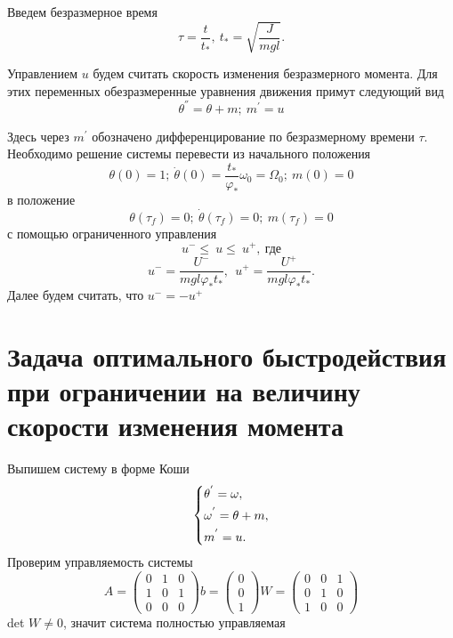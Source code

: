 \documentclass[a4paper,14pt]{article}
\theoremstyle{plain} %
\theoremstyle{definition} %
\theoremstyle{remark} %
\begin{document}
{Введем безразмерное время
\[
    \tau=\frac{t}{t_\ast},\ t_\ast=\sqrt{\frac{J}{mgl}}.
\]

Управлением $u$ будем считать скорость изменения безразмерного
момента. Для этих переменных обезразмеренные уравнения движения
примут следующий вид
\[
    \theta^{''}=\theta+m;\ m^{'}=u
\]

Здесь через $m^{'}$ обозначено дифференцирование по
безразмерному времени $\tau$. Необходимо решение системы
перевести из начального положения
\begin{equation}\label{9}
    \theta(0)=1;\ \dot{\theta}(0)=\frac{t_\ast}{\varphi_\ast}\omega_0=\Omega_0;\ m(0)=0
\end{equation}
в положение
\begin{equation}\label{9}
    \theta(\tau_f)=0;\ \dot{\theta}(\tau_f)=0;\ m(\tau_f)=0
\end{equation}
с помощью ограниченного управления
\[
    u^-\le\ u\le\ u^+,\ \text{где}
\]
\[
    u^-=\frac{U^-}{mgl\varphi_\ast t_\ast},\ \ u^+=\frac{U^+}{mgl\varphi_\ast t_\ast}.
\]
Далее будем считать, что $u^-=-u^+$
\newpage
\section{Задача оптимального быстродействия при ограничении на величину скорости изменения момента}
Выпишем систему в форме Коши
\begin{equation}\label{koshisystem}
    \left\{ {\begin{aligned}
                 & \theta^{'} = \omega , \hfill   \\
                 & \omega^{'} = \theta+m , \hfill \\
                 & m^{'} = u . \hfill             \\
            \end{aligned}} \right.
\end{equation}
Проверим управляемость системы
\begin{equation*}
    A =
    \begin{pmatrix}
        0 & 1 & 0 \\
        1 & 0 & 1 \\
        0 & 0 & 0
    \end{pmatrix}
    b =
    \begin{pmatrix}
        0 \\
        0 \\
        1
    \end{pmatrix}
    W =
    \begin{pmatrix}
        0 & 0 & 1 \\
        0 & 1 & 0 \\
        1 & 0 & 0
    \end{pmatrix}
\end{equation*}
det $W\neq0$, значит система полностью управляемая

}
\end{document}
